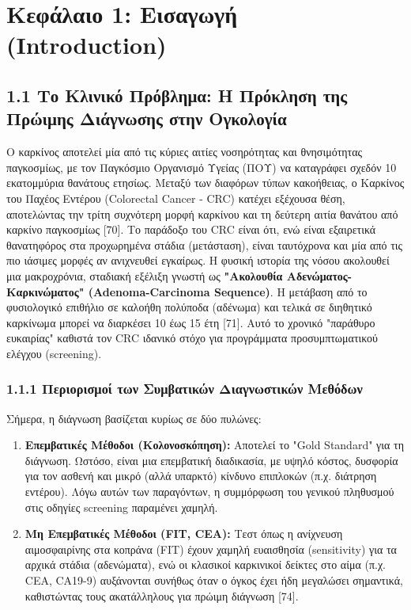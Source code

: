 \section{Κεφάλαιο 1: Εισαγωγή (Introduction)}

\subsection{1.1 Το Κλινικό Πρόβλημα: Η Πρόκληση της Πρώιμης Διάγνωσης στην Ογκολογία}

Ο καρκίνος αποτελεί μία από τις κύριες αιτίες νοσηρότητας και θνησιμότητας παγκοσμίως, με τον Παγκόσμιο Οργανισμό Υγείας (ΠΟΥ) να καταγράφει σχεδόν 10 εκατομμύρια θανάτους ετησίως. Μεταξύ των διαφόρων τύπων κακοήθειας, ο Καρκίνος του Παχέος Εντέρου (Colorectal Cancer - CRC) κατέχει εξέχουσα θέση, αποτελώντας την τρίτη συχνότερη μορφή καρκίνου και τη δεύτερη αιτία θανάτου από καρκίνο παγκοσμίως [70]. Το παράδοξο του CRC είναι ότι, ενώ είναι εξαιρετικά θανατηφόρος στα προχωρημένα στάδια (μετάσταση), είναι ταυτόχρονα και μία από τις πιο ιάσιμες μορφές αν ανιχνευθεί εγκαίρως. Η φυσική ιστορία της νόσου ακολουθεί μια μακροχρόνια, σταδιακή εξέλιξη γνωστή ως \textbf{"Ακολουθία Αδενώματος-Καρκινώματος" (Adenoma-Carcinoma Sequence)}. Η μετάβαση από το φυσιολογικό επιθήλιο σε καλοήθη πολύποδα (αδένωμα) και τελικά σε διηθητικό καρκίνωμα μπορεί να διαρκέσει 10 έως 15 έτη [71]. Αυτό το χρονικό "παράθυρο ευκαιρίας" καθιστά τον CRC ιδανικό στόχο για προγράμματα προσυμπτωματικού ελέγχου (screening).

\subsubsection{1.1.1 Περιορισμοί των Συμβατικών Διαγνωστικών Μεθόδων}

Σήμερα, η διάγνωση βασίζεται κυρίως σε δύο πυλώνες:

\begin{enumerate}
\item \textbf{Επεμβατικές Μέθοδοι (Κολονοσκόπηση):} Αποτελεί το "Gold Standard" για τη διάγνωση. Ωστόσο, είναι μια επεμβατική διαδικασία, με υψηλό κόστος, δυσφορία για τον ασθενή και μικρό (αλλά υπαρκτό) κίνδυνο επιπλοκών (π.χ. διάτρηση εντέρου). Λόγω αυτών των παραγόντων, η συμμόρφωση του γενικού πληθυσμού στις οδηγίες screening παραμένει χαμηλή.
\item \textbf{Μη Επεμβατικές Μέθοδοι (FIT, CEA):} Τεστ όπως η ανίχνευση αιμοσφαιρίνης στα κοπράνα (FIT) έχουν χαμηλή ευαισθησία (sensitivity) για τα αρχικά στάδια (αδενώματα), ενώ οι κλασικοί καρκινικοί δείκτες στο αίμα (π.χ. CEA, CA19-9) αυξάνονται συνήθως όταν ο όγκος έχει ήδη μεγαλώσει σημαντικά, καθιστώντας τους ακατάλληλους για πρώιμη διάγνωση [74].
\end{enumerate}

